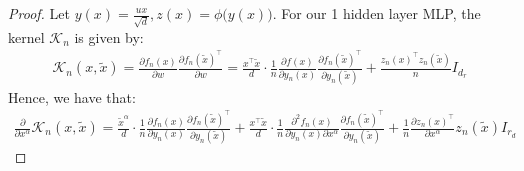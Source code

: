 \documentclass{article}
\theoremstyle{definition}
\theoremstyle{remark}
\renewcommand{\[}{\begin{eqnarray}}
\renewcommand{\]}{\end{eqnarray}}
\renewcommand{\[}{\begin{eqnarray}}
\renewcommand{\]}{\end{eqnarray}}
\begin{document}
\begin{proof}
Let $y(x) = \frac{ux}{\sqrt{d}}, z(x) = \phi \big(y(x)\big)$.
For our 1 hidden layer MLP, the kernel $\mathcal{K}_n$ is given by:
\begin{align}
    \mathcal{K}_n(x,\tilde{x}) = \frac{\partial f_n(x)}{\partial w}\frac{\partial  f_n(\tilde{x})^\top}{\partial w} = \frac{x^\top \tilde{x}}{d}\cdot \frac{1}{n}\frac{\partial f(x)}{\partial y_n(x)}\frac{\partial f_n(\tilde{x})^\top}{\partial y_n(\tilde{x})} + \frac{z_n(x)^\top z_n(\tilde{x})}{n}I_{d_r}
\end{align}
Hence, we have that:
\begin{align}
    \frac{\partial}{\partial x^\alpha}\mathcal{K}_n(x,\tilde{x}) = \frac{\tilde{x}^\alpha}{d}\cdot \frac{1}{n}\frac{\partial f_n(x)}{\partial y_n(x)}\frac{\partial f_n(\tilde{x})^\top}{\partial y_n(\tilde{x})} + \frac{x^\top \tilde{x}}{d}\cdot \frac{1}{n}\frac{\partial^2 f_n(x)}{\partial y_n(x) \partial x^\alpha}\frac{\partial f_n(\tilde{x})^\top}{\partial y_n(\tilde{x})} + \frac{1}{n}\frac{\partial z_n(x)^\top}{\partial x^\alpha}z_n(\tilde{x})I_{r_d}
\end{align}


\end{proof}
\end{document}
